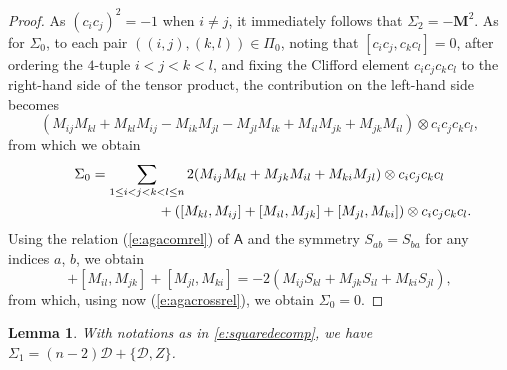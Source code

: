 \documentclass[pdftex]{sigma}
\numberwithin{equation}{section}
\newtheorem{Lemma}[Theorem]{Lemma}
\begin{document}
\begin{proof}
As $(c_ic_j)^2 = -1$ when $i\neq j$, it immediately follows that $\Sigma_2 = -\mathbf{M}^2$. As for $\Sigma_0$, to each pair $((i,j),(k,l)) \in \Pi_0$, noting that $[c_ic_j,c_kc_l]=0$, after ordering the $4$-tuple $i<j<k<l$,
and fixing the Clifford element $c_ic_jc_kc_l$ to the right-hand side of the tensor product, the contribution on the left-hand side becomes
\begin{equation*}
(M_{ij}M_{kl} + M_{kl}M_{ij} - M_{ik}M_{jl} - M_{jl}M_{ik} + M_{il}M_{jk} + M_{jk}M_{il})\otimes c_ic_jc_kc_l,
\end{equation*}
from which we obtain
\begin{gather*}
 \Sigma_0 = \sum_{1\leq i<j<k<l \leq n}
 2(M_{ij}M_{kl} + M_{jk}M_{il} + M_{ki}M_{jl})\otimes c_ic_jc_kc_l\\
\hphantom{\Sigma_0 = \sum_{1\leq i<j<k<l \leq n}}{}
+ ([M_{kl},M_{ij}] + [M_{il},M_{jk}] + [M_{jl},M_{ki}])\otimes c_ic_jc_kc_l.
\end{gather*}
Using the relation (\ref{e:agacomrel}) of $\mathsf{A}$ and the symmetry $S_{ab} = S_{ba}$ for any indices $a$, $b$, we obtain
\begin{equation*}
 [M_{kl},M_{ij}] + [M_{il},M_{jk}] + [M_{jl},M_{ki}] =
 -2(M_{ij}S_{kl} + M_{jk}S_{il} + M_{ki}S_{jl}),
\end{equation*}
from which, using now (\ref{e:agacrossrel}), we obtain $\Sigma_0=0$.
\end{proof}

\begin{Lemma}With notations as in \eqref{e:squaredecomp}, we have $\Sigma_1 = (n-2)\mathcal{D} + \{\mathcal{D},Z\}$.
\end{Lemma}
\end{document}
